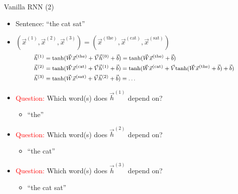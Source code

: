 \documentclass[11pt,compress,t,notes=noshow, xcolor=table]{beamer}
\begin{document}
\begin{vbframe}{Vanilla RNN (2)}

\vfill

	\begin{itemize}
		\item Sentence: ``the cat sat''
		\item $(\vec x^{(1)}, \vec x^{(2)}, \vec x^{(3)}) = (\vec x^{(\text{the})}, \vec x^{(\text{cat})}, \vec x^{(\text{sat})})$
			$$
			\footnotesize
			\begin{aligned}
				\vec h^{(1)} & = \mathrm{tanh}(\vec W \vec x^{(\text{the})} + \vec V \vec h^{(0)} + \vec b) = \mathrm{tanh}(\vec W \vec x^{(\text{the})} + \vec b) \\
				\vec h^{(2)} & = \mathrm{tanh}(\vec W \vec x^{(\text{cat})} + \vec V \vec h^{(1)}+ \vec b) = \mathrm{tanh}(\vec W \vec x^{(\text{cat})} + \vec V \mathrm{tanh}(\vec W \vec x^{(\text{the})} + \vec b) + \vec b) \\
				\vec h^{(3)} & = \mathrm{tanh}(\vec W \vec x^{(\text{sat})} + \vec V \vec h^{(2)} + \vec b) = \ldots
			\end{aligned}
			$$
		\item \textcolor{red}{Question:} Which word(s) does $\vec h^{(1)}$ depend on?
			\begin{itemize}
					\item ``the''
			\end{itemize}
		\item \textcolor{red}{Question:} Which word(s) does $\vec h^{(2)}$ depend on?
			\begin{itemize}
					\item ``the cat''
			\end{itemize}
		\item \textcolor{red}{Question:} Which word(s) does $\vec h^{(3)}$ depend on?
			\begin{itemize}
					\item ``the cat sat''
			\end{itemize}
	\end{itemize}

\vfill

\end{vbframe}

\end{document}
